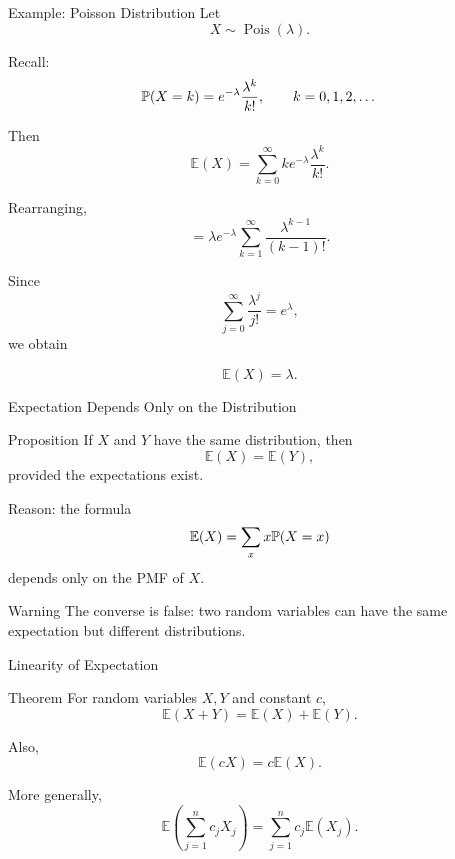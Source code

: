 



\begin{frame}{Example: Poisson Distribution}
Let
\[
X\sim \operatorname{Pois}(\lambda).
\]

Recall:
\[
\mathbb{P}(X=k)
=
e^{-\lambda}
\frac{\lambda^k}{k!},
\qquad
k=0,1,2,\dots
\]

Then
\[
\mathbb{E}(X)
=
\sum_{k=0}^{\infty}
k
e^{-\lambda}
\frac{\lambda^k}{k!}.
\]

Rearranging,
\[
=
\lambda e^{-\lambda}
\sum_{k=1}^{\infty}
\frac{\lambda^{k-1}}{(k-1)!}.
\]

Since
\[
\sum_{j=0}^\infty
\frac{\lambda^j}{j!}
=
e^\lambda,
\]
we obtain

\[
{
\mathbb{E}(X)=\lambda.
}
\]
\end{frame}











\begin{frame}{Expectation Depends Only on the Distribution}
\begin{keybox}{Proposition}
If $X$ and $Y$ have the same distribution, then
\[
\mathbb{E}(X)=\mathbb{E}(Y),
\]
provided the expectations exist.
\end{keybox}


Reason: the formula
\[
\mathbb{E}(X)=\sum_x x\mathbb{P}(X=x)
\]
depends only on the PMF of $X$.

\vspace{0.25cm}

\begin{livebox}{Warning}
The converse is false: two random variables can have the same expectation but different distributions.
\end{livebox}
\end{frame}



\begin{frame}{Linearity of Expectation}
\begin{keybox}{Theorem}
For random variables $X,Y$ and constant $c$,
\[
\boxed{
\mathbb{E}(X+Y)=\mathbb{E}(X)+\mathbb{E}(Y).
}
\]

Also,
\[
\boxed{
\mathbb{E}(cX)=c\mathbb{E}(X).
}
\]
\end{keybox}

\vspace{0.25cm}

More generally,
\[
\mathbb{E}\left(\sum_{j=1}^n c_jX_j\right)
=
\sum_{j=1}^n c_j\mathbb{E}(X_j).
\]
\end{frame}



